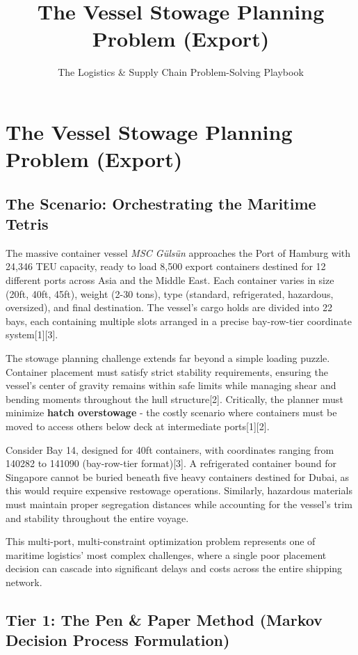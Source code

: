 \documentclass{article}
\title{The Vessel Stowage Planning Problem (Export)}
\author{The Logistics \& Supply Chain Problem-Solving Playbook}
\date{}
\begin{document}
\maketitle

\section{The Vessel Stowage Planning Problem (Export)}

\subsection{The Scenario: Orchestrating the Maritime Tetris}

The massive container vessel \textit{MSC Gülsün} approaches the Port of Hamburg with 24,346 TEU capacity, ready to load 8,500 export containers destined for 12 different ports across Asia and the Middle East. Each container varies in size (20ft, 40ft, 45ft), weight (2-30 tons), type (standard, refrigerated, hazardous, oversized), and final destination. The vessel's cargo holds are divided into 22 bays, each containing multiple slots arranged in a precise bay-row-tier coordinate system[1][3].

The stowage planning challenge extends far beyond a simple loading puzzle. Container placement must satisfy strict stability requirements, ensuring the vessel's center of gravity remains within safe limits while managing shear and bending moments throughout the hull structure[2]. Critically, the planner must minimize \textbf{hatch overstowage} - the costly scenario where containers must be moved to access others below deck at intermediate ports[1][2].

Consider Bay 14, designed for 40ft containers, with coordinates ranging from 140282 to 141090 (bay-row-tier format)[3]. A refrigerated container bound for Singapore cannot be buried beneath five heavy containers destined for Dubai, as this would require expensive restowage operations. Similarly, hazardous materials must maintain proper segregation distances while accounting for the vessel's trim and stability throughout the entire voyage.

This multi-port, multi-constraint optimization problem represents one of maritime logistics' most complex challenges, where a single poor placement decision can cascade into significant delays and costs across the entire shipping network.

\subsection{Tier 1: The Pen \& Paper Method (Markov Decision Process Formulation)}
\end{document}
